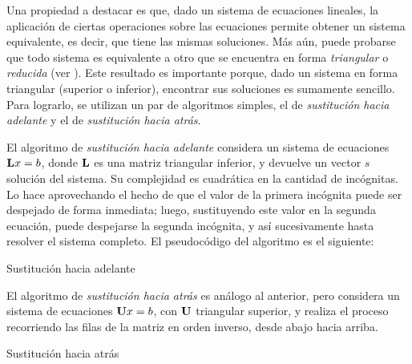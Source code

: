       Una propiedad a destacar es que, dado un sistema de ecuaciones lineales, la aplicación de ciertas operaciones sobre las ecuaciones permite obtener un sistema equivalente, es decir, que tiene las mismas soluciones. Más aún, puede probarse que todo sistema es equivalente a otro que se encuentra en forma \emph{triangular} o \emph{reducida} (ver \cite[p.~358]{burden}). Este resultado es importante porque, dado un sistema en forma triangular (superior o inferior), encontrar sus soluciones es sumamente sencillo. Para lograrlo, se utilizan un par de algoritmos simples, el de \emph{sustitución hacia adelante} y el de \emph{sustitución hacia atrás}.

      El algoritmo de \emph{sustitución hacia adelante} considera un sistema de ecuaciones $\mathbf{L}x=b$, donde $\mathbf{L}$ es una matriz triangular inferior, y devuelve un vector $s$ solución del sistema. Su complejidad es cuadrática en la cantidad de incógnitas. Lo hace aprovechando el hecho de que el valor de la primera incógnita puede ser despejado de forma inmediata; luego, sustituyendo este valor en la segunda ecuación, puede despejarse la segunda incógnita, y así sucesivamente hasta resolver el sistema completo. El pseudocódigo del algoritmo es el siguiente:

      \vspace*{1em}
      \begin{algorithm}[H]
        \caption{Sustitución hacia adelante}
      \end{algorithm}
      \vspace*{1em}

      El algoritmo de \emph{sustitución hacia atrás} es análogo al anterior, pero considera un sistema de ecuaciones $\mathbf{U}x=b$, con $\mathbf{U}$ triangular superior, y realiza el proceso recorriendo las filas de la matriz en orden inverso, desde abajo hacia arriba.

      \vspace*{1em}
      \begin{algorithm}[H]
        \caption{Sustitución hacia atrás}
      \end{algorithm}
      \vspace*{1em}

